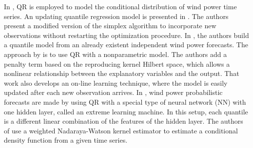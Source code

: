 


%






In \cite{gallego2016line,moller_time-adaptive_2008,nielsen2006,bremnes_probabilistic_2004,wan_direct_2017}, QR is employed to model the conditional distribution of wind power time series.
An updating quantile regression model is presented in \cite{moller_time-adaptive_2008}. The authors present a modified version of the simplex algorithm to incorporate new observations without restarting the optimization procedure.
In \cite{nielsen2006}, the authors build a quantile model from an already existent independent wind power forecasts. The approach by \cite{gallego2016line} is to use QR with a nonparametric model. The authors add a penalty term based on the reproducing kernel Hilbert space, which allows a nonlinear relationship between the explanatory variables and the output. That work also develops an on-line learning technique, where the model is easily updated after each new observation arrives.
In \cite{wan_direct_2017}, wind power probabilistic forecasts are made by using QR with a special type of neural network (NN) with one hidden layer, called an extreme learning machine. In this setup, each quantile is a different linear combination of the features of the hidden layer. The authors of \cite{cai_regression_2002} use a weighted Nadaraya-Watson kernel estimator to estimate a conditional density function from a given time series.


